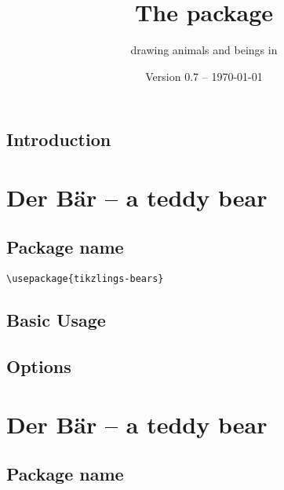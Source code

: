 \documentclass[parskip=half]{scrartcl}
\title{The \texorpdfstring{\tikzlings}{tikzlings} package}
\subtitle{drawing animals and beings in \TikZ}
\author{%
	\texorpdfstring{\texttt{samcarter} (alias 
		\tikzset{external/export=false}%
		\begin{tikzpicture}[scale=0.3,baseline=3pt]
			\duck[body=yellow!50!brown!50!white,
					longhair=red!50!brown, 
					jacket=blue!50!black]
		\end{tikzpicture})\\[0.8em]
		\url{https://github.com/samcarter8/tikzlings}
	}{samcarter}}
\date{Version 0.7 -- \today}
\begin{document}
\maketitle
\thispagestyle{scrheadings}

\subsection*{Introduction}
\label{intro}

\section{Der B\"ar -- a teddy bear}

\subsection{Package name}

\begin{tcolorbox}
\vspace*{0.5cm}
\lstinline|\usepackage{tikzlings-bears}|
\vspace*{0.5cm}
\end{tcolorbox}

\subsection{Basic Usage}

\begin{tcblisting}{}
\bear
\end{tcblisting}

\subsection{Options}

\begin{tcblisting}{}
\bear[body=SteelBlue]
\end{tcblisting}

\begin{tcblisting}{}
\bear[3D]
\end{tcblisting}


\section{Der B\"ar -- a teddy bear}

\subsection{Package name}
\end{document}
